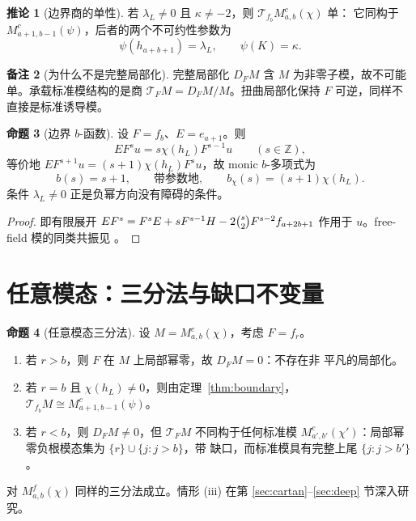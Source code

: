 \documentclass[UTF8,11pt]{ctexart}
\newcommand{\Z}{\mathbb Z}
\newcommand{\T}{\mathcal T}
\theoremstyle{definition}
\newtheorem{proposition}{命题}[section]
\newtheorem{corollary}[proposition]{推论}
\newtheorem{remark}[proposition]{备注}
\begin{document}
\begin{corollary}[边界商的单性]\label{cor:simple}
若 \(\lambda_L\ne0\) 且 \(\kappa\ne-2\)，则 \(\T_{f_b}M^c_{a,b}(\chi)\) 单：
它同构于 \(M^c_{a+1,b-1}(\psi)\)，后者的两个不可约性参数为
\[
\psi(h_{a+b+1})=\lambda_L,\qquad \psi(K)=\kappa.
\]
\end{corollary}

\begin{remark}[为什么不是完整局部化]\label{rem:full}
完整局部化 \(D_FM\) 含 \(M\) 为非零子模，故不可能单。承载标准模结构的是商
\(\T_FM=D_FM/M\)。扭曲局部化保持 \(F\) 可逆，同样不直接是标准诱导模。
\end{remark}

\begin{proposition}[边界 \(b\)-函数]\label{prop:bfun}
设 \(F=f_b\)、\(E=e_{a+1}\)。则
\[
EF^su=s\chi(h_L)F^{s-1}u\qquad(s\in\Z),
\]
等价地 \(EF^{s+1}u=(s+1)\chi(h_L)F^su\)，故 monic \(b\)-多项式为
\[
b(s)=s+1,\qquad\text{带参数地},\qquad b_\chi(s)=(s+1)\chi(h_L).
\]
条件 \(\lambda_L\ne0\) 正是负幂方向没有障碍的条件。
\end{proposition}

\begin{proof}
即有限展开 \(EF^s=F^sE+sF^{s-1}H-2\tbinom{s}{2}F^{s-2}f_{a+2b+1}\) 作用于
\(u\)。free-field 模的同类共振见 \cite[Section 5]{FGM}。
\end{proof}

\section{任意模态：三分法与缺口不变量}\label{sec:trichotomy}

\begin{proposition}[任意模态三分法]\label{prop:trichotomy}
设 \(M=M^c_{a,b}(\chi)\)，考虑 \(F=f_r\)。
\begin{enumerate}[label=\textup{(\roman*)},leftmargin=2.8em]
\item 若 \(r>b\)，则 \(F\) 在 \(M\) 上局部幂零，故 \(D_FM=0\)：不存在非
平凡的局部化。
\item 若 \(r=b\) 且 \(\chi(h_L)\ne0\)，则由定理~\ref{thm:boundary}，
\(\T_{f_b}M\cong M^c_{a+1,b-1}(\psi)\)。
\item 若 \(r<b\)，则 \(D_FM\ne0\)，但 \(\T_FM\) 不同构于任何标准模
\(M^c_{a',b'}(\chi')\)：局部幂零负根模态集为 \(\{r\}\cup\{j:j>b\}\)，带
缺口，而标准模具有完整上尾 \(\{j:j>b'\}\)。
\end{enumerate}
对 \(M^f_{a,b}(\chi)\) 同样的三分法成立。情形 (iii) 在第
\ref{sec:cartan}--\ref{sec:deep} 节深入研究。
\end{proposition}
\end{document}
